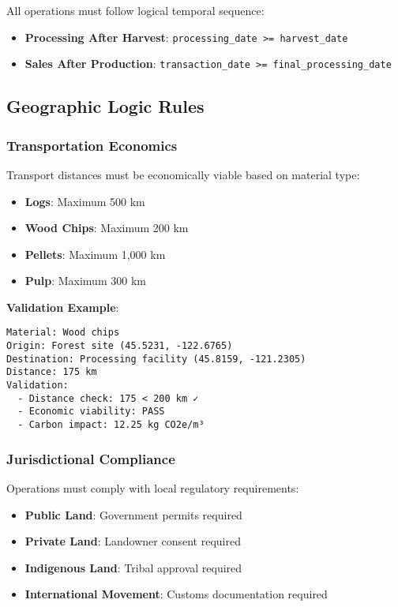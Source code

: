 All operations must follow logical temporal sequence:

\begin{itemize}
    \item \textbf{Processing After Harvest}: \texttt{processing\_date >= harvest\_date}
    \item \textbf{Sales After Production}: \texttt{transaction\_date >= final\_processing\_date}
\end{itemize}

\subsection{Geographic Logic Rules}
\label{sec:geographic-logic}

\subsubsection{Transportation Economics}

Transport distances must be economically viable based on material type:

\begin{itemize}
    \item \textbf{Logs}: Maximum 500 km
    \item \textbf{Wood Chips}: Maximum 200 km  
    \item \textbf{Pellets}: Maximum 1,000 km
    \item \textbf{Pulp}: Maximum 300 km
\end{itemize}

\textbf{Validation Example}:
\begin{verbatim}
Material: Wood chips
Origin: Forest site (45.5231, -122.6765)
Destination: Processing facility (45.8159, -121.2305)
Distance: 175 km
Validation:
  - Distance check: 175 < 200 km ✓
  - Economic viability: PASS
  - Carbon impact: 12.25 kg CO2e/m³
\end{verbatim}

\subsubsection{Jurisdictional Compliance}

Operations must comply with local regulatory requirements:

\begin{itemize}
    \item \textbf{Public Land}: Government permits required
    \item \textbf{Private Land}: Landowner consent required
    \item \textbf{Indigenous Land}: Tribal approval required
    \item \textbf{International Movement}: Customs documentation required
\end{itemize}

